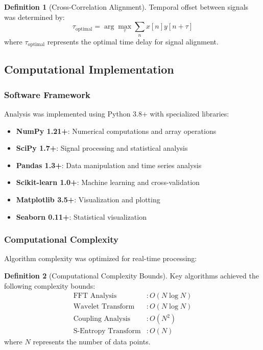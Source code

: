 \documentclass[12pt,a4paper]{article}
\theoremstyle{definition}
\newtheorem{definition}{Definition}[section]
\begin{document}
\begin{definition}[Cross-Correlation Alignment]
Temporal offset between signals was determined by:
\begin{equation}
\tau_{\text{optimal}} = \arg\max_\tau \sum_{n} x[n] y[n+\tau]
\end{equation}
where $\tau_{\text{optimal}}$ represents the optimal time delay for signal alignment.
\end{definition}

\subsection{Computational Implementation}

\subsubsection{Software Framework}

Analysis was implemented using Python 3.8+ with specialized libraries:

\begin{itemize}
\item \textbf{NumPy 1.21+}: Numerical computations and array operations
\item \textbf{SciPy 1.7+}: Signal processing and statistical analysis
\item \textbf{Pandas 1.3+}: Data manipulation and time series analysis
\item \textbf{Scikit-learn 1.0+}: Machine learning and cross-validation
\item \textbf{Matplotlib 3.5+}: Visualization and plotting
\item \textbf{Seaborn 0.11+}: Statistical visualization
\end{itemize}

\subsubsection{Computational Complexity}

Algorithm complexity was optimized for real-time processing:

\begin{definition}[Computational Complexity Bounds]
Key algorithms achieved the following complexity bounds:
\begin{align}
\text{FFT Analysis} &: O(N \log N) \\
\text{Wavelet Transform} &: O(N \log N) \\
\text{Coupling Analysis} &: O(N^2) \\
\text{S-Entropy Transform} &: O(N)
\end{align}
where $N$ represents the number of data points.
\end{definition}
\end{document}
